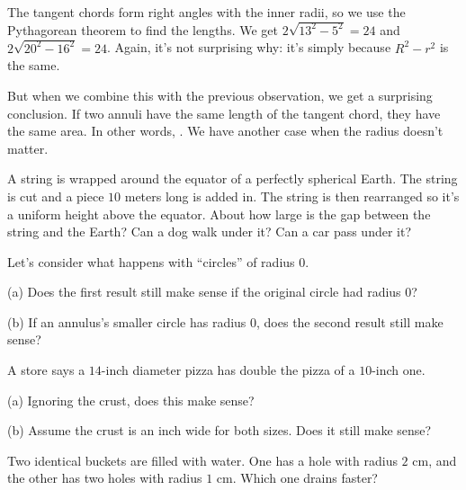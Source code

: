 \documentclass[11pt,paper=letter]{scrartcl}
\let\faBoltOld\faBolt
\renewcommand{\faBolt}{{\relsize{-1}\faBoltOld}}
\begin{document}
The tangent chords form right angles with the inner radii, so we use the Pythagorean theorem to find the lengths. We get $2\sqrt{13^2 - 5^2} = 24$ and $2\sqrt{20^2 - 16^2} = 24$. Again, it's not surprising why: it's simply because $R^2 - r^2$ is the same.

But when we combine this with the previous observation, we get a surprising conclusion. If two annuli have the same length of the tangent chord, they have the same area. In other words, . We have another case when the radius doesn't matter.

\begin{mdframed}[style=exmdbox]
  \begin{exercise}
    A string is wrapped around the equator of a perfectly spherical Earth. The string is cut and a piece $10$ meters long is added in. The string is then rearranged so it's a uniform height above the equator. About how large is the gap between the string and the Earth? Can a dog walk under it? Can a car pass under it?
  \end{exercise}

  \begin{exercise}
    Let's consider what happens with ``circles'' of radius $0$.
    \begin{enumthin}
      \item[(a)] Does the first result still make sense if the original circle had radius $0$?
      \item[(b)] If an annulus's smaller circle has radius $0$, does the second result still make sense?
    \end{enumthin}
  \end{exercise}

  \begin{problem}
    A store says a $14$-inch diameter pizza has double the pizza of a $10$-inch one.
    \begin{enumthin}
      \item[(a)] Ignoring the crust, does this make sense?
      \item[(b)] Assume the crust is an inch wide for both sizes. Does it still make sense? \hint{\ref{h:an31}}
    \end{enumthin}
  \end{problem}

  \begin{problem}[\faBolt]
    Two identical buckets are filled with water. One has a hole with radius $2 \text{ cm}$, and the other has two holes with radius $1 \text{ cm}$. Which one drains faster? \hints{\ref{h:an41} \ref{h:an42}} %
  \end{problem}
\end{mdframed}
\end{document}
